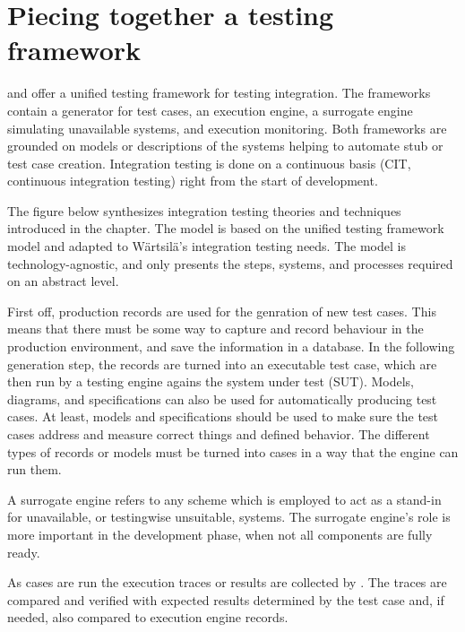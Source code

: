 \documentclass[12pt,a4paper,oneside,pdftex]{report}
\begin{document}
{{\chapter{Piecing together a testing framework}
\label{chapter:framework}

\citet{huang2008surrogate} and \citet{liu2009unified} offer a unified testing framework for testing integration. The frameworks contain a generator for test cases, an execution engine, a surrogate engine simulating unavailable systems, and execution monitoring. Both frameworks are grounded on models or descriptions of the systems helping to automate stub or test case creation. Integration testing is done on a continuous basis (CIT, continuous integration testing) right from the start of development.

The figure below synthesizes integration testing theories and techniques introduced in the chapter. The model is based on the \citet{liu2009unified} unified testing framework model and adapted to Wärtsilä's integration testing needs. The model is technology-agnostic, and only presents the steps, systems, and processes required on an abstract level.

First off, production records are used for the genration of new test cases. This means that there must be some way to capture and record behaviour in the production environment, and save the information in a database. In the following generation step, the records are turned into an executable test case, which are then run by a testing engine agains the system under test (SUT). Models, diagrams, and specifications can also be used for automatically producing test cases. At least, models and specifications should be used to make sure the test cases address and measure correct things and defined behavior. The different types of records or models must be turned into cases in a way that the engine can run them. 

A surrogate engine refers to any scheme which is employed to act as a stand-in for unavailable, or testingwise unsuitable, systems. The surrogate engine's role is more important in the development phase, when not all components are fully ready.

As cases are run the execution traces or results are collected by . The traces are compared and verified with expected results determined by the test case and, if needed, also compared to execution engine records. 


}}
\end{document}
